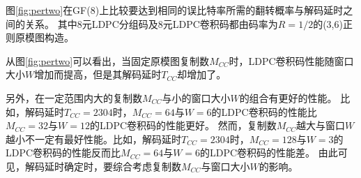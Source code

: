 图\ref{fig:pertwo}在GF($8$)上比较要达到相同的误比特率所需的翻转概率与解码延时之间的关系。
其中8元LDPC分组码及8元LDPC卷积码都由码率为$R=1/2$的(3,6)正则原模图构造。

从图\ref{fig:pertwo}可以看出，当固定原模图复制数$M_{CC}$时，LDPC卷积码性能随窗口大小$W$增加而提高，但是其解码延时$T_{CC}$却增加了。

另外，在一定范围内大的复制数$M_{CC}$与小的窗口大小$W$的组合有更好的性能。
比如，解码延时$T_{CC}=2304$时，$M_{CC}=64$与$W=6$的LDPC卷积码的性能比$M_{CC}=32$与$W=12$的LDPC卷积码的性能更好。
然而，复制数$M_{CC}$越大与窗口$W$越小不一定有最好性能。比如，解码延时$T_{CC}=2304$时，$M_{CC}=128$与$W=3$的LDPC卷积码的性能反而比$M_{CC}=64$与$W=6$的LDPC卷积码的性能差。
由此可见，解码延时确定时，要综合考虑复制数$M_{CC}$与窗口大小$W$的影响。